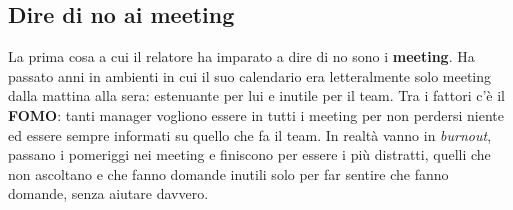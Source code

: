\subsection{Dire di no ai meeting}

La prima cosa a cui il relatore ha imparato a dire di no sono i \textbf{meeting}.
Ha passato anni in ambienti in cui il suo calendario era letteralmente solo
meeting dalla mattina alla sera: estenuante per lui e inutile per il team. Tra i
fattori c'è il \textbf{FOMO}: tanti manager vogliono essere in tutti i meeting per
non perdersi niente ed essere sempre informati su quello che fa il team. In realtà
vanno in \emph{burnout}, passano i pomeriggi nei meeting e finiscono per essere i
più distratti, quelli che non ascoltano e che fanno domande inutili solo per far
sentire che fanno domande, senza aiutare davvero.

